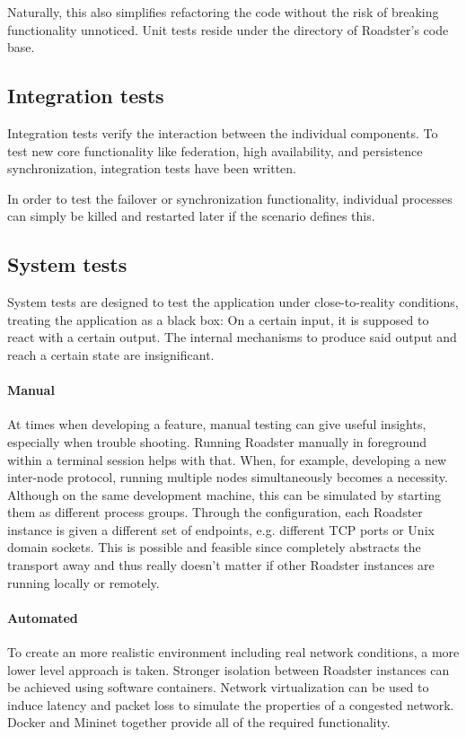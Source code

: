 Naturally, this also simplifies refactoring the code without the risk of
breaking functionality unnoticed. Unit tests reside under the 
directory of Roadster's code base.


\subsection{Integration tests}
Integration tests verify the interaction between the individual components.
To test new core functionality like federation, high availability, and persistence
synchronization, integration tests have been written.

In order to test the failover or synchronization functionality, individual processes
can simply be killed and restarted later if the scenario defines this.


\subsection{System tests}
System tests are designed to test the application under close-to-reality
conditions, treating the application as a black box: On a certain input, it is
supposed to react with a certain output. The internal mechanisms to produce said
output and reach a certain state are insignificant.


\paragraph{Manual} At times when developing a feature, manual testing can give
useful insights, especially when trouble shooting. Running Roadster manually in
foreground within a terminal session helps with that.  When, for example,
developing a new inter-node protocol, running multiple nodes simultaneously
becomes a necessity. Although on the same development machine, this can be
simulated by starting them as different process groups. Through the
configuration, each Roadster instance is given a different set of endpoints,
e.g. different TCP ports or Unix domain sockets. This is possible and feasible
since \zmq completely abstracts the transport away and thus really doesn't
matter if other Roadster instances are running locally or remotely.

\paragraph{Automated} To create an more realistic environment including real
network conditions, a more lower level approach is taken. Stronger isolation
between Roadster instances can be achieved using software containers. Network
virtualization can be used to induce latency and packet loss to simulate the
properties of a congested network.
Docker and Mininet together provide all of the required functionality.

